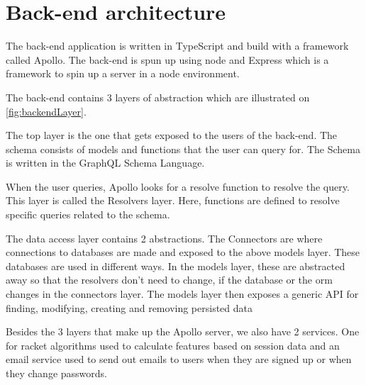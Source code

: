 \section{Back-end architecture}
The back-end application is written in \gls{TypeScript} and build with a framework called \gls{Apollo}.
The back-end is spun up using \gls{node} and Express which is a framework to spin up a server in a \gls{node} environment.

The back-end contains 3 layers of abstraction which are illustrated on \ref{fig:backendLayer}.


The top layer is the one that gets exposed to the users of the back-end. The schema consists of models and functions that the user can query for. The Schema is written in the GraphQL Schema Language.

When the user queries, Apollo looks for a resolve function to resolve the query. This layer is called the Resolvers layer. Here, functions are defined to resolve specific queries related to the schema. 

The data access layer contains 2 abstractions. The Connectors are where connections to databases are made and exposed to the above models layer. These databases are used in different ways. In the models layer, these are abstracted away so that the resolvers don't need to change, if the database or the \gls{orm} changes in the connectors layer. The models layer then exposes a generic API for finding, modifying, creating and removing persisted data

Besides the 3 layers that make up the Apollo server, we also have 2 services. One for racket algorithms used to calculate features based on session data and an email service used to send out emails to users when they are signed up or when they change passwords.